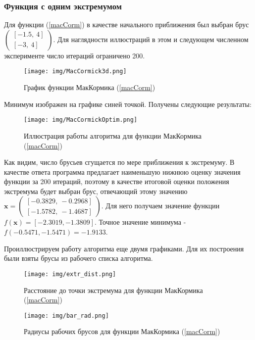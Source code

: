 \documentclass[a4paper]{article}
\begin{document}
\subsubsection{Функция с одним экстремумом}
Для функции (\ref{macCorm}) в качестве начального приближения был выбран брус $\begin{pmatrix}
[-1.5,\: 4]\\
[-3,\: 4]
\end{pmatrix}$. Для наглядности иллюстраций в этом и следующем численном эксперименте число итераций ограничено 200.
\begin{figure}[H]
    \centering
    \texttt{[image: img/MacCormick3d.png]}
    \caption{График функции МакКормика (\ref{macCorm})}
    \label{fig:macCorm}
\end{figure}
Минимум изображен на графике синей точкой. Получены следующие результаты:
\begin{figure}[H]
    \centering
    \texttt{[image: img/MacCormickOptim.png]}
    \caption{Иллюстрация работы алгоритма для функции МакКормика (\ref{macCorm})}
    \label{fig:proc1}
\end{figure}
Как видим, число брусьев сгущается по мере приближения к экстремуму. В качестве ответа программа предлагает наименьшую нижнюю оценку значения функции за 200 итераций, поэтому в качестве итоговой оценки положения экстремума будет выбран брус, отвечающий этому значению $\mathbf{x}=\begin{pmatrix}
[   -0.3829,\:    -0.2968]\\ 
[   -1.5782,\:   -1.4687]
\end{pmatrix}$. Для него получаем значение функции $f(\mathbf{x})=[   -2.3019,    -1.3809]$. Точное значение минимума - $f(-0.5471, -1.5471)=-1.9133$. 

Проиллюстрируем работу алгоритма еще двумя графиками. Для их построения были взяты брусы из рабочего списка алгоритма.
\begin{figure}[H]
    \centering
    \texttt{[image: img/extr\_dist.png]}
    \caption{Расстояние до точки экстремума для функции МакКормика (\ref{macCorm})}
    \label{fig:mcExtr}
\end{figure}
\begin{figure}[H]
    \centering
    \texttt{[image: img/bar\_rad.png]}
    \caption{Радиусы рабочих брусов для функции МакКормика (\ref{macCorm})}
    \label{fig:mcRad}
\end{figure}
\end{document}

